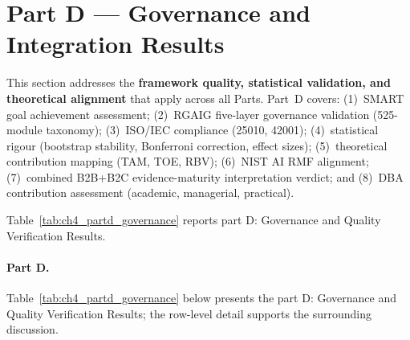 \section{Part D --- Governance and Integration Results}
\label{sec:ch4_part_d}

This section addresses the \textbf{framework quality, statistical validation, and theoretical alignment} that apply across all Parts. Part~D covers: (1)~SMART goal achievement assessment; (2)~RGAIG five-layer governance validation (525-module taxonomy); (3)~ISO/IEC compliance (25010, 42001); (4)~statistical rigour (bootstrap stability, Bonferroni correction, effect sizes); (5)~theoretical contribution mapping (TAM, TOE, RBV); (6)~NIST AI RMF alignment; (7)~combined B2B+B2C evidence-maturity interpretation verdict; and (8)~DBA contribution assessment (academic, managerial, practical).

\noindent Table~\ref{tab:ch4_partd_governance} reports part D: Governance and Quality Verification Results.

\paragraph{Part D.}


\noindent Table~\ref{tab:ch4_partd_governance} below presents the part D: Governance and Quality Verification Results; the row-level detail supports the surrounding discussion.

